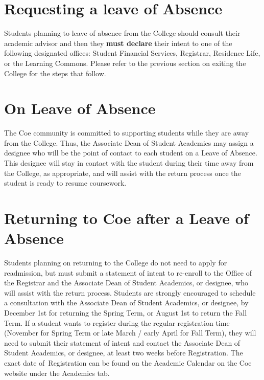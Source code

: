 \documentclass[
  letterpaper,
]{scrbook}
\begin{document}
\section{Requesting a leave of
Absence}\label{requesting-a-leave-of-absence}

Students planning to leave of absence from the College should consult
their academic advisor and then they \textbf{must declare} their intent
to one of the following designated offices: Student Financial Services,
Registrar, Residence Life, or the Learning Commons. Please refer to the
previous section on exiting the College for the steps that follow.~

\section{On Leave of Absence}\label{on-leave-of-absence}

The Coe community is committed to supporting students while they are
away from the College. Thus, the Associate Dean of Student Academics may
assign a designee who will be the point of contact to each student on a
Leave of Absence. This designee will stay in contact with the student
during their time away from the College, as appropriate, and will assist
with the return process once the student is ready to resume coursework.~

\section{Returning to Coe after a Leave of
Absence}\label{returning-to-coe-after-a-leave-of-absence}

Students planning on returning to the College do not need to apply for
readmission, but must submit a statement of intent to re-enroll to the
Office of the Registrar and the Associate Dean of Student Academics, or
designee, who will assist with the return process. Students are strongly
encouraged to schedule a consultation with the Associate Dean of Student
Academics, or designee, by December 1st for returning the Spring Term,
or August 1st to return the Fall Term. If a student wants to register
during the regular registration time (November for Spring Term or late
March / early April for Fall Term), they will need to submit their
statement of intent and contact the Associate Dean of Student Academics,
or designee, at least two weeks before Registration. The exact date
of~Registration can be found on the Academic Calendar on the Coe website
under the Academics tab.~
\end{document}
